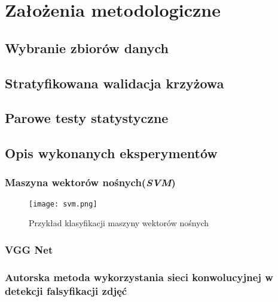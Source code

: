 \chapter{Założenia metodologiczne}

\section{Wybranie zbiorów danych}

\section{Stratyfikowana walidacja krzyżowa}

\section{Parowe testy statystyczne}

\section{Opis wykonanych eksperymentów}

\subsection{Maszyna wektorów nośnych(\textit{SVM})}

\begin{figure}[h!]
	\texttt{[image: svm.png]}
	\centering
	\caption{Przykład klasyfikacji maszyny wektorów nośnych}
	\label{fig:svm}
\end{figure}

\subsection{VGG Net}

\subsection{ Autorska metoda wykorzystania sieci konwolucyjnej w detekcji falsyfikacji zdjęć}